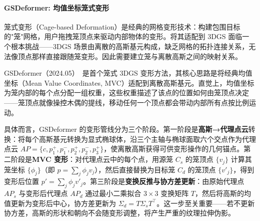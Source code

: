 \begin{table}[htbp]
\centering
\caption{3DGS 几何变形方法对比}
\label{tab:ch09_deformation}
\end{table}

\paragraph{GSDeformer: 均值坐标笼式变形}

笼式变形（Cage-based Deformation）是经典的网格变形技术：构建包围目标的"笼"网格，用户拖拽笼顶点来驱动内部物体的变形。将其适配到 3DGS 面临一个根本挑战——3DGS 场景由离散的高斯基元构成，缺乏网格的拓扑连接关系，无法像顶点那样直接跟随笼变形。因此需要建立笼与离散高斯之间的映射关系。

GSDeformer（2024.05）~\cite{2405_15491}是首个笼式 3DGS 变形方法，其核心思路是将经典均值坐标（Mean Value Coordinates, MVC）适配到离散高斯基元。直觉上，均值坐标为笼内部的每个点分配一组权重，这些权重描述了该点的位置如何由笼顶点决定——笼顶点就像操控木偶的提线，移动任何一个顶点都会带动内部所有点按比例运动。

具体而言，GSDeformer 的变形管线分为三个阶段。第一阶段是\textbf{高斯→代理点云}转换：将每个高斯基元转换为显式椭球体，沿三个主轴与椭球面取六个交点作为代理点云 $AP = \{c, p_1^+, p_1^-, p_2^+, p_2^-, p_3^+\}$，使离散高斯获得可供变形操作的几何锚点。第二阶段是\textbf{MVC 变形}：对代理点云中的每个点，用源笼 $C_s$ 的笼顶点 $\{v_j\}$ 计算其笼坐标 $\{\phi_j\}$（即 $p = \sum_j \phi_j v_j$），然后直接替换为目标笼 $C_d$ 的笼顶点 $\{v'_j\}$，得到变形后位置 $p' = \sum_j \phi_j v'_j$。第三阶段是\textbf{变换反推与协方差更新}：由原始代理点 $AP_s$ 与变形后代理点 $AP_d$ 通过最小二乘拟合 $3 \times 3$ 变换矩阵 $T$，然后将高斯的均值更新为变形后中心，协方差更新为 $\Sigma_d = T \Sigma_s T^\top$。这一步至关重要——若不更新协方差，高斯的形状和朝向不会随变形调整，将产生严重的纹理拉伸伪影。

